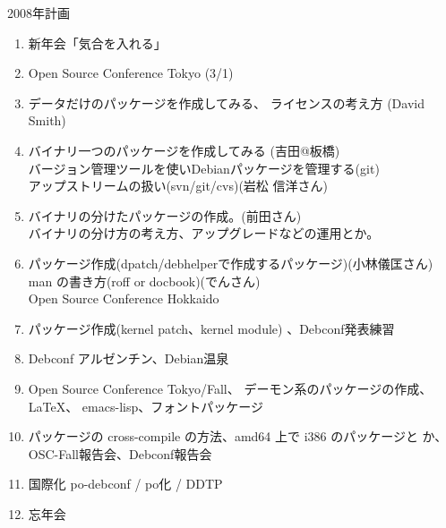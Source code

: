 
\begin{frame}{2008年計画}

{\scriptsize
\begin{enumerate}
 \item 新年会「気合を入れる」
 \item Open Source Conference Tokyo (3/1)
 \item データだけのパッケージを作成してみる、
       ライセンスの考え方 (David Smith)
 \item バイナリ一つのパッケージを作成してみる (吉田@板橋)\\
       バージョン管理ツールを使いDebianパッケージを管理する(git)\\
       アップストリームの扱い(svn/git/cvs)(岩松 信洋さん)
 \item バイナリの分けたパッケージの作成。(前田さん)\\
       バイナリの分け方の考え方、アップグレードなどの運用とか。
 \item パッケージ作成(dpatch/debhelperで作成するパッケージ)(小林儀匡さん)\\
       man の書き方(roff or docbook)(でんさん)\\
       Open Source Conference Hokkaido
 \item パッケージ作成(kernel patch、kernel module)
       、Debconf発表練習
 \item Debconf アルゼンチン、Debian温泉

 \item Open Source Conference Tokyo/Fall、
       デーモン系のパッケージの作成、\LaTeX{}、 emacs-lisp、フォントパッケージ
 \item パッケージの cross-compile の方法、amd64 上で i386 のパッケージと
       か、OSC-Fall報告会、Debconf報告会
 \item 国際化 po-debconf / po化 / DDTP
 \item 忘年会
\end{enumerate}
}
\end{frame}

